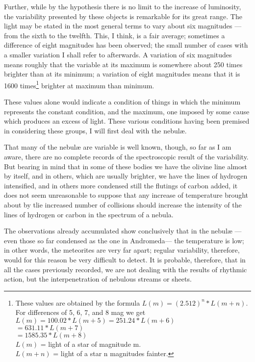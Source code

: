 \documentclass[a4paper, 12pt, oneside, polutonikogreek, english]{article}
\begin{document}
Further, while by the hypothesis there is no limit to the increase of luminosity, the variability presented by these objects is remarkable for its great range. The light may be stated in the most general terms to vary about six magnitudes --- from the sixth to the twelfth. This, I think, is a fair average; sometimes a difference of eight magnitudes has been observed; the small number of cases with a smaller variation I shall refer to afterwards. A variation of six magnitudes means roughly that the variable at its maximum is somewhere about 250 times brighter than at its minimum; a variation of eight magnitudes means that it is 1600 times\footnote{These values are obtained by the formula $L(m) = (2.512)^n * L(m+n)$.\\\hspace*{8mm}For differences of 5, 6, 7, and 8 mag we get\\\hspace*{10mm}$L(m) = 100.02 * L(m+5) = 251.24 * L(m+6)$\\\hspace*{20mm}$= 631.11 * L(m+7)$\\\hspace*{20mm}$= 1585.35 * L(m+8)$\\\hspace*{10mm}$L(m)$ = light of a star of magnitude m.\\\hspace*{10mm}$L(m+n)$ = light of a star n magnitudes fainter.} brighter at maximum than minimum.

These values alone would indicate a condition of things in which the minimum represents the constant condition, and the maximum, one imposed by some cause which produces an excess of light. These various conditions having been premised in considering these groups, I will first deal with the nebulæ.

That many of the nebulæ are variable is well known, though, so far as I am aware, there are no complete records of the spectroscopic result of the variability. But bearing in mind that in some of these bodies we have the olivine line almost by itself, and in others, which are usually brighter, we have the lines of hydrogen intensified, and in others more condensed still the flutings of carbon added, it does not seem unreasonable to suppose that any increase of temperature brought about by tlie increased number of collisions should increase the intensity of the lines of hydrogen or carbon in the spectrum of a nebula.

The observations already accumulated show conclusively that in the nebulæ --- even those so far condensed as the one in Andromeda--- the temperature is low; in other words, the meteorites are very far apart; regular variability, therefore, would for this reason be very difficult to detect. It is probable, therefore, that in all the cases previously recorded, we are not dealing with the results of rhythmic action, but the interpenetration of nebulous streams or sheets.
\end{document}
